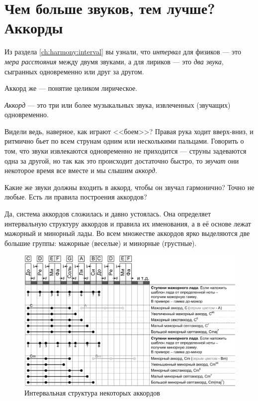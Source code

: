 \section{Чем больше звуков, тем лучше? Аккорды}
\label{ch:harmony:chords}

Из раздела \ref{ch:harmony:interval} вы узнали, что \emph{интервал} для физиков --- это \emph{мера расстояния} между двумя звуками, а для лириков --- это \emph{два звука}, сыгранных одновременно или друг за другом.

Аккорд же --- понятие целиком лирическое.

\begin{Definition}[Аккорд]
    \emph{Аккорд} --- это три или более музыкальных звука, извлеченных (звучащих) одновременно.
\end{Definition}

Видели ведь, наверное, как играют <<боем>>? Правая рука ходит вверх-вниз, и ритмично бьет по всем струнам одним или несколькими пальцами. Говорить о том, что звуки извлекаются одновременно не приходится --- струны задеваются одна за другой, но так как это происходит достаточно быстро, то \emph{звучат} они некоторое время все вместе и мы слышим \emph{аккорд}.

Какие же звуки должны входить в аккорд, чтобы он звучал гармонично? Точно не любые. Есть ли правила построения аккордов?

Да, система аккордов сложилась и давно устоялась. Она определяет интервальную структуру аккордов и правила их именования, а в её основе лежат мажорный и минорный лады. Во всем множестве аккордов ярко выделяются две большие группы: мажорные (веселые) и минорные (грустные).

\begin{figure}[!ht]
    \centering
    \includegraphics[width=\textwidth]{fig/chords/structure} 
    \caption{Интервальная структура некоторых аккордов}\label{fig:harmony:chords:structure}
\end{figure} 

